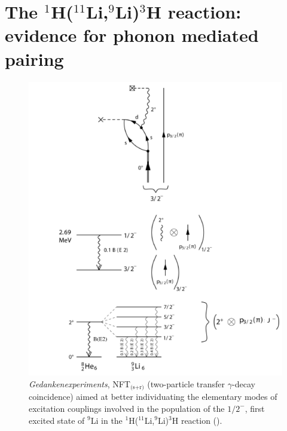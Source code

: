  \section[Evidence for phonon mediated pairing]{The $^1$H($^{11}$Li,$^9$Li)$^3$H reaction: evidence for phonon mediated pairing}\label{C8S1}
    \begin{figure}
    \centerline{\includegraphics*[width=16cm,angle=0]{C8/figsC8/fig8_1_3x}}
    	\caption{\emph{Gedankenexperiments}, NFT$_{\text{(s+r)}}$ (two-particle transfer $\gamma$-decay coincidence) aimed at better individuating the elementary modes of excitation couplings involved in the population of the $1/2^-$, first excited state of $^9$Li  in the  
    	 $^1$H($^{11}$Li,$^9$Li)$^3$H  reaction (\cite{Tanihata:08,Barranco:01,Potel:10}). }\label{fig8_1_3}
    \end{figure}

